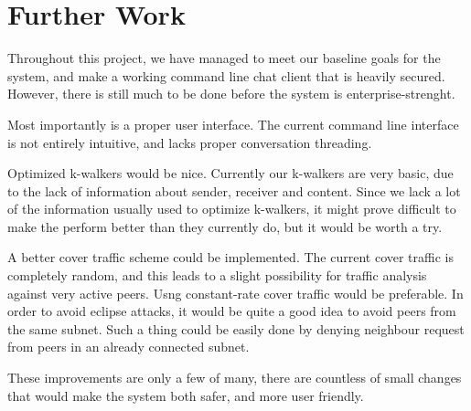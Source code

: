 \section{Further Work}

Throughout this project, we have managed to meet our baseline goals for the system, and make a working command line chat client that is heavily secured. However, there is still much to be done before the system is enterprise-strenght.

Most importantly is a proper user interface. The current command line interface is not entirely intuitive, and lacks proper conversation threading.

Optimized k-walkers would be nice. Currently our k-walkers are very basic, due to the lack of information about sender, receiver and content. Since we lack a lot of the information usually used to optimize k-walkers, it might prove difficult to make the perform better than they currently do, but it would be worth a try.

A better cover traffic scheme could be implemented. The current cover traffic is completely random, and this leads to a slight possibility for traffic analysis against very active peers. Usng constant-rate cover traffic would be preferable.
In order to avoid eclipse attacks, it would be quite a good idea to avoid peers from the same subnet. Such a thing could be easily  done by denying neighbour request from peers in an  already connected subnet.

These improvements are only a few of many, there are countless of small changes that would make the system both safer, and more user friendly.